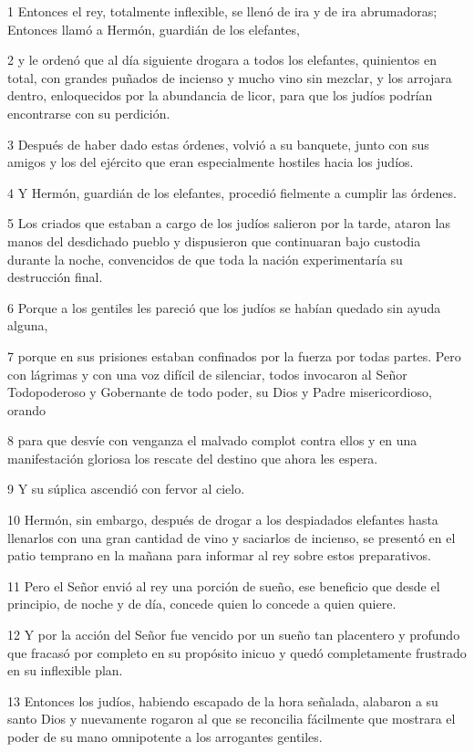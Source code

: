 \par 1 Entonces el rey, totalmente inflexible, se llenó de ira y de ira abrumadoras; Entonces llamó a Hermón, guardián de los elefantes,
\par 2 y le ordenó que al día siguiente drogara a todos los elefantes, quinientos en total, con grandes puñados de incienso y mucho vino sin mezclar, y los arrojara dentro, enloquecidos por la abundancia de licor, para que los judíos podrían encontrarse con su perdición.
\par 3 Después de haber dado estas órdenes, volvió a su banquete, junto con sus amigos y los del ejército que eran especialmente hostiles hacia los judíos.
\par 4 Y Hermón, guardián de los elefantes, procedió fielmente a cumplir las órdenes.
\par 5 Los criados que estaban a cargo de los judíos salieron por la tarde, ataron las manos del desdichado pueblo y dispusieron que continuaran bajo custodia durante la noche, convencidos de que toda la nación experimentaría su destrucción final.
\par 6 Porque a los gentiles les pareció que los judíos se habían quedado sin ayuda alguna,
\par 7 porque en sus prisiones estaban confinados por la fuerza por todas partes. Pero con lágrimas y con una voz difícil de silenciar, todos invocaron al Señor Todopoderoso y Gobernante de todo poder, su Dios y Padre misericordioso, orando
\par 8 para que desvíe con venganza el malvado complot contra ellos y en una manifestación gloriosa los rescate del destino que ahora les espera.
\par 9 Y su súplica ascendió con fervor al cielo.
\par 10 Hermón, sin embargo, después de drogar a los despiadados elefantes hasta llenarlos con una gran cantidad de vino y saciarlos de incienso, se presentó en el patio temprano en la mañana para informar al rey sobre estos preparativos.
\par 11 Pero el Señor envió al rey una porción de sueño, ese beneficio que desde el principio, de noche y de día, concede quien lo concede a quien quiere.
\par 12 Y por la acción del Señor fue vencido por un sueño tan placentero y profundo que fracasó por completo en su propósito inicuo y quedó completamente frustrado en su inflexible plan.
\par 13 Entonces los judíos, habiendo escapado de la hora señalada, alabaron a su santo Dios y nuevamente rogaron al que se reconcilia fácilmente que mostrara el poder de su mano omnipotente a los arrogantes gentiles.
